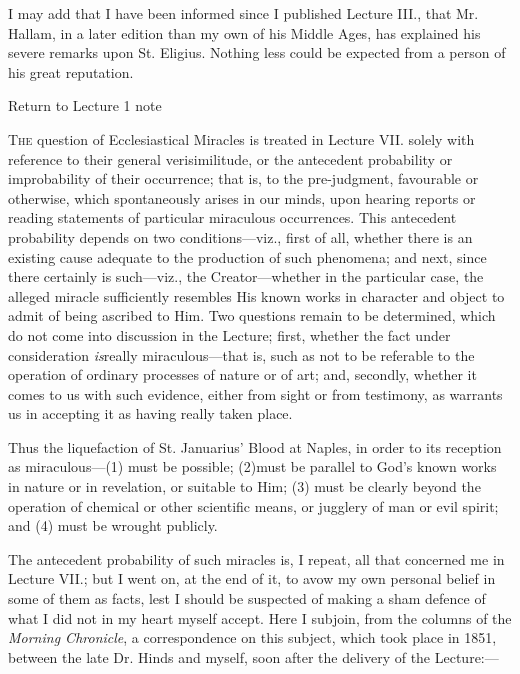 I may add that I have been informed since I published
Lecture III., that Mr. Hallam, in a later edition than my
own of his Middle Ages, has explained his severe remarks
upon St. Eligius. Nothing less could be expected from a
person of his great reputation.


Return to Lecture 1 note








T\textsc{he} question of Ecclesiastical Miracles is treated in
Lecture VII. solely with reference to their general
verisimilitude, or the antecedent probability or
improbability of their occurrence; that is, to the
pre-judgment, favourable or otherwise, which
spontaneously arises in our minds, upon hearing reports
or reading statements of particular miraculous
occurrences. This antecedent probability depends on two
conditions—viz., first of all, whether there is an
existing cause adequate to the production of such
phenomena; and next, since there certainly is
such—viz., the Creator—whether in the
particular case, the alleged miracle sufficiently
resembles His known works in character and object to
admit of being ascribed to Him. Two questions remain to
be determined, which do not come into discussion in the
Lecture; first, whether the fact under consideration \emph{is}really miraculous—that is, such as not to be
referable to the operation of ordinary processes of
nature or of art; and, secondly, whether it comes to us
with such evidence, either from sight or from testimony,
as warrants us in accepting it as having really taken
place.


Thus the liquefaction of St. Januarius' Blood at
Naples, in order to its reception as miraculous—(1)
must be possible; (2)\textbf{}must be parallel to God's
known works in nature or in revelation, or suitable to
Him; (3) must be clearly beyond the operation of chemical
or other scientific means, or jugglery of man or evil
spirit; and (4) must be wrought publicly.


The antecedent probability of such miracles is, I
repeat, all that concerned me in Lecture VII.; but I went
on, at the end of it, to avow my own personal belief in
some of them as facts, lest I should be suspected of
making a sham defence of what I did not in my heart
myself accept. Here I subjoin, from the columns of the \emph{Morning
Chronicle}, a correspondence on this subject, which
took place in 1851, between the late Dr. Hinds and
myself, soon after the delivery of the Lecture:—


